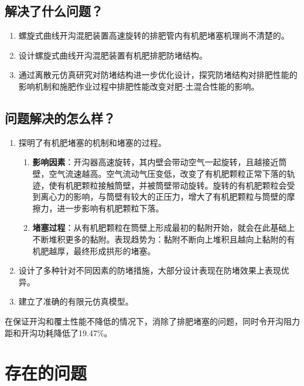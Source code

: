 \documentclass[fontset=windows]{ctexart}
\begin{document}
\subsection{解决了什么问题？}

\begin{enumerate}
	\item 螺旋式曲线开沟混肥装置高速旋转的排肥管内有机肥堵塞机理尚不清楚的。
	\item 设计螺旋式曲线开沟混肥装置有机肥排肥防堵结构。
	\item 通过离散元仿真研究对防堵结构进一步优化设计，探究防堵结构对排肥性能的影响机制和施肥作业过程中排肥性能改变对肥-土混合性能的影响。
\end{enumerate}

\subsection{问题解决的怎么样？}

\begin{enumerate}
	\item 探明了有机肥堵塞的机制和堵塞的过程。
	
	\begin{enumerate}
		\item \textbf{影响因素}：开沟器高速旋转，其内壁会带动空气一起旋转，且越接近筒壁，空气流速越高。空气流动气压变低，改变了有机肥颗粒正常下落的轨迹，使有机肥颗粒接触筒壁，并被筒壁带动旋转。旋转的有机肥颗粒会受到离心力的影响，与筒壁有较大的正压力，增大了有机肥颗粒与筒壁的摩擦力，进一步影响有机肥颗粒下落。
		\item \textbf{堵塞过程}：从有机肥颗粒在筒壁上形成最初的黏附开始，就会在此基础上不断堆积更多的黏附。表现趋势为：黏附不断向上堆积且越向上黏附的有机肥越厚，最终形成拱形的堵塞。
	\end{enumerate}

	\item 设计了多种针对不同因素的防堵措施，大部分设计表现在防堵效果上表现优异。
	
	\item 建立了准确的有限元仿真模型。

\end{enumerate}

在保证开沟和覆土性能不降低的情况下，消除了排肥堵塞的问题，同时令开沟阻力距和开沟功耗降低了19.47\%。

\section{存在的问题}
\end{document}
